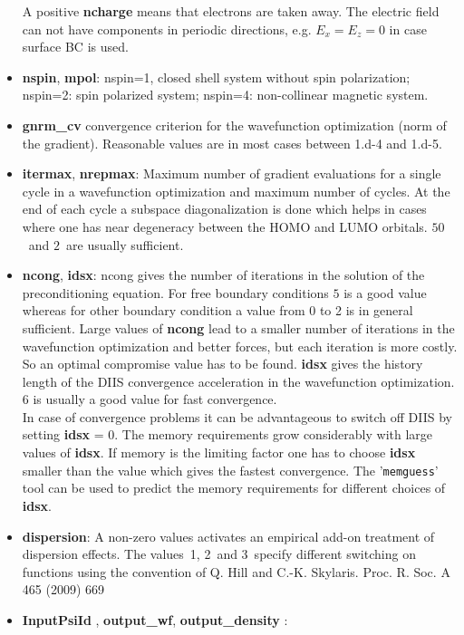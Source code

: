 \documentclass[a4paper,11pt]{report}
\begin{document}
\begin{itemize}
      A positive {\bf ncharge} means that electrons are taken away. 
      The electric field can not have components in periodic directions, e.g. $E_x=E_z=0$ in case surface BC is used.
\item {\bf nspin}, {\bf mpol}: 
      nspin=1, closed shell system without spin polarization;\hfill\\
      nspin=2: spin polarized system; 
      nspin=4: non-collinear magnetic system.
\item {\bf gnrm\_cv} convergence criterion for the wavefunction optimization (norm of the gradient).
      Reasonable values are in most cases between 1.d-4 and 1.d-5.
\item {\bf itermax}, {\bf nrepmax}: Maximum number of gradient evaluations for a single cycle in a wavefunction optimization 
      and maximum number of cycles. At the end of each cycle a subspace diagonalization is done which helps 
in cases where one has near degeneracy between the HOMO and LUMO orbitals. $50$~and $2$~are usually sufficient.
\item {\bf ncong}, {\bf idsx}: ncong gives the number of iterations in the solution of the preconditioning equation.
      For free boundary conditions $5$ is a good value whereas for other  boundary condition a value from 0 to 2 is in general sufficient. 
      Large values of {\bf ncong} lead to a smaller number of iterations in 
      the wavefunction optimization and better forces, but each iteration is more costly. 
      So an optimal compromise value has to be found.
      {\bf idsx} gives the history length of the DIIS convergence acceleration in the wavefunction optimization.
      6 is usually a good value for fast convergence.\\
      In case of convergence problems it can be advantageous 
      to switch off DIIS by setting {\bf idsx} = 0. The memory requirements grow considerably with large values of 
      {\bf idsx}. If memory is the limiting factor one has to choose {\bf idsx} smaller than the value which gives 
      the fastest convergence. The '\texttt{memguess}' tool can be used to predict the memory requirements for different choices 
      of  {\bf idsx}.
\item {\bf dispersion}:  A non-zero values activates an  empirical add-on treatment of dispersion effects.
      The values~1, 2~and 3~specify different switching on functions using the convention of 
      Q. Hill and C.-K. Skylaris.  Proc. R. Soc. A 465  (2009) 669
\item {\bf InputPsiId }, {\bf  output\_wf},  {\bf output\_density }: 

\end{itemize}
\end{document}
